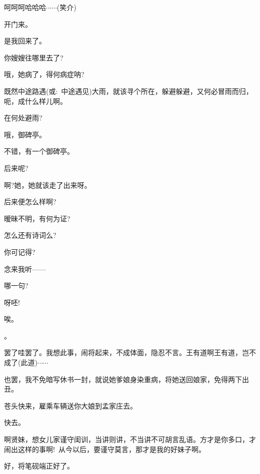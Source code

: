 {\vspace{5pt}

{呵呵呵哈哈哈$\cdots{}\cdots{}$({\hwfs 笑介})}


{开门来。}

{是我回来了。}


{你嫂嫂往哪里去了?}

{哦，她病了，得何病症呐?}

{既然中途路遇({\akai 或}:~中途遇见)大雨，就该寻个所在，躲避躲避，又何必冒雨而归，呃，成什么样儿啊。}

{在何处避雨?}

{哦，御碑亭。}

{不错，有一个御碑亭。}

{后来呢?}

{啊?她，她就该走了出来呀。}

{后来便怎么样啊?}

{暧昧不明，有何为证?}

{怎么还有诗词么?}

{你可记得?}

{念来我听------}

{哪一句?}

{呀呸!}


{唉。}

。

{罢了哇罢了。我想此事，闹将起来，不成体面，隐忍不言。王有道啊王有道，岂不成了(此道)$\cdots{}\cdots{}$}

{也罢，我不免暗写休书一封，就说她爹娘身染重病，将她送回娘家，免得两下出丑。}

{苍头快来，雇乘车辆送你大娘到孟家庄去。}

{快去。}

{啊贤妹，想女儿家谨守闺训，当讲则讲，不当讲不可胡言乱语。方才是你多口，才闹出这样的事啊!~从今以后，要谨守莫言，那才是我的好妹子啊。}

{好，将笔砚端正好了。}

}

